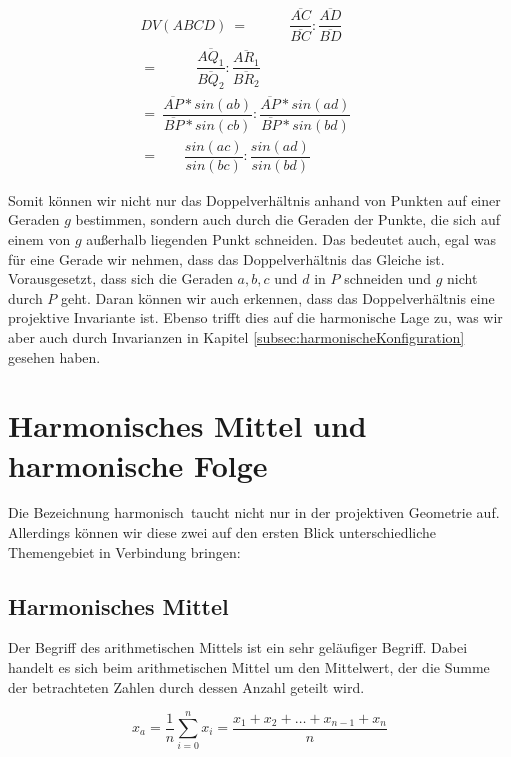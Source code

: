 \documentclass[12pt,a4paper]{article}
\begin{document}
\begin{equation*}
\begin{split}
DV(A B C D)~=~~~~~~~~~~~~~\dfrac{\overline{A C}}{\overline{B C}} : \dfrac{\overline{A D}}{\overline{B D}}~~~~~~~~~~~~\\
=~~~~~~~~~~~~\dfrac{\overline{A Q_1}}{\overline{B Q_2}} : \dfrac{\overline{A R_1}}{\overline{B R_2}}~~~~~~~~~~~\\
=~\dfrac{\overline{A P} * sin(ab)}{\overline{B P} * sin(cb)} : \dfrac{\overline{A P} * sin(ad)}{\overline{B P} * sin(bd)} \\
=~~~~~~~~\dfrac{sin(ac)}{sin(bc)} : \dfrac{sin(ad)}{sin(bd)}~~~~~~~~
\end{split}
\end{equation*}

Somit können wir nicht nur das Doppelverhältnis anhand von Punkten auf einer Geraden $g$ bestimmen, sondern auch durch die Geraden der Punkte, die sich auf einem von $g$ außerhalb liegenden Punkt schneiden. Das bedeutet auch, egal was für eine Gerade wir nehmen, dass das Doppelverhältnis das Gleiche ist. Vorausgesetzt, dass sich die Geraden $a, b, c$ und $d$ in $P$ schneiden und $g$ nicht durch $P$ geht. Daran können wir auch erkennen, dass das Doppelverhältnis eine projektive Invariante ist. Ebenso trifft dies auf die harmonische Lage zu, was wir aber auch durch Invarianzen in Kapitel \ref{subsec:harmonischeKonfiguration} gesehen haben.

\newpage
\section{Harmonisches Mittel und harmonische Folge}
\label{sec:harmMittel}

Die Bezeichnung \glqq harmonisch\grqq ~taucht nicht nur in der projektiven Geometrie auf. Allerdings können wir diese zwei auf den ersten Blick unterschiedliche Themengebiet in Verbindung bringen:

\subsection{Harmonisches Mittel}

Der Begriff des arithmetischen Mittels ist ein sehr geläufiger Begriff. Dabei handelt es sich beim arithmetischen Mittel um den Mittelwert, der die Summe der betrachteten Zahlen durch dessen Anzahl geteilt wird.

\[x_a = \dfrac{1}{n} \sum_{i=0}^n x_i = \dfrac{x_1 + x_2 + \dots + x_{n-1} + x_n}{n}\]
\end{document}
